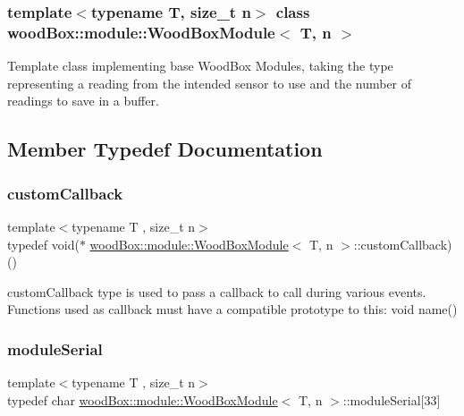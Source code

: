 \subsubsection*{template$<$typename T, size\+\_\+t n$>$\newline
class wood\+Box\+::module\+::\+Wood\+Box\+Module$<$ T, n $>$}

Template class implementing base Wood\+Box Modules, taking the type representing a reading from the intended sensor to use and the number of readings to save in a buffer. 

\subsection{Member Typedef Documentation}
\mbox{\label{classwood_box_1_1module_1_1_wood_box_module_ab6d400f05cc572fb9fd28dd0baf6d346}} 
\subsubsection{\texorpdfstring{custom\+Callback}{customCallback}}
{\footnotesize\ttfamily template$<$typename T , size\+\_\+t n$>$ \\
typedef void($\ast$ \mbox{\hyperlink{classwood_box_1_1module_1_1_wood_box_module}{wood\+Box\+::module\+::\+Wood\+Box\+Module}}$<$ T, n $>$\+::custom\+Callback) ()}

custom\+Callback type is used to pass a callback to call during various events. Functions used as callback must have a compatible prototype to this\+: void name() \mbox{\label{classwood_box_1_1module_1_1_wood_box_module_a3a6503bbd5147a06ba50081f97177b46}} 
\subsubsection{\texorpdfstring{module\+Serial}{moduleSerial}}
{\footnotesize\ttfamily template$<$typename T , size\+\_\+t n$>$ \\
typedef char \mbox{\hyperlink{classwood_box_1_1module_1_1_wood_box_module}{wood\+Box\+::module\+::\+Wood\+Box\+Module}}$<$ T, n $>$\+::module\+Serial\mbox{[}33\mbox{]}}


